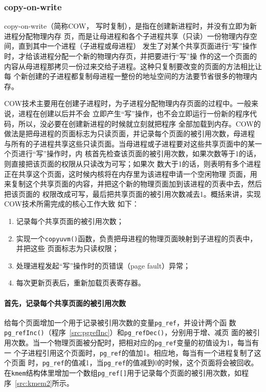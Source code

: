 \documentclass{swfcthesismscctex}
\begin{document}
\subsubsection{copy-on-write}

copy-on-write（简称COW， 写时复制），是指在创建新进程时，并没有立即为新进程分配物理内存
页，而是让母进程和各个子进程共享（只读）一份物理内存空间，直到其中一个进程（子进程或母进程）
发生了对某个共享页面进行``写''操作时，才给该进程分配一个新的物理内存页，并把要进行``写''操
作的这一个页面的内容从母进程那拷贝一份过来交给子进程。这种只复制要改变的页面的方法相比让每
个新创建的子进程都复制母进程一整份的地址空间的方法要节省很多的物理内存。

COW技术主要用在创建子进程时，为子进程分配物理内存页面的过程中。一般来说，进程在创建以后并不会
立即产生``写''操作，也不会立即运行一份新的程序代码，所以，没必要在创建新进程的时候就立刻就把程序
全部加载到内存。COW的做法是把母进程的页面标志为只读页面，并记录每个页面的被引用次数，母进程
与所有的子进程共享这些只读页面。当母进程或子进程要对这些共享页面中的某一个页进行``写''操作时，内
核首先检查该页面的被引用次数，如果次数等于1的话，则直接把该页面的权限从只读改为可写；如果次
数大于1的话，则表明有多个进程正在共享这个页面，这时候内核将在内存里为该进程申请一个空闲物理
页面，用来复制这个共享页面的内容，并把这个新的物理页面加到该进程的页表中去，然后把该页面的
权限改成可写，最后把共享页面的被引用次数减去1。概括来讲，实现COW技术所需完成的核心工作大致
如下：
\begin{enumerate}
\item 记录每个共享页面的被引用次数；
\item 实现一个\texttt{copyuvm()}函数，负责把母进程的物理页面映射到子进程的页表中，并把这些
  页面标志为只读权限；
\item 处理进程发起``写''操作时的页错误（page fault）异常；
\item 每次更新页表后，重新加载页表寄存器。
\end{enumerate}

\paragraph{首先，记录每个共享页面的被引用次数}

给每个页面增加一个用于记录被引用次数的变量\texttt{pg\_ref}，并设计两个函
数\texttt{pg\_refInc()}（程序~\ref{src:pgrefInc}）和\texttt{pg\_refDec()}，分别用于增、减页
面的被引用次数。当一个物理页面被分配时，把相对应的\texttt{pg\_ref}变量的初值设为1，每当有一
个子进程引用这个页面时，\texttt{pg\_ref}的值加1。相应地，每当有一个进程复制了这个页面
时，\texttt{pg\_ref}的值减1，当\texttt{pg\_ref}的值减到0的时候，这个页面将会被回收。
在\texttt{kmem}结构体里增加一个数组\texttt{pg\_ref[]}用于记录每个页面的被引用次数，如程
序~\ref{src:kmem2}所示。
\end{document}
